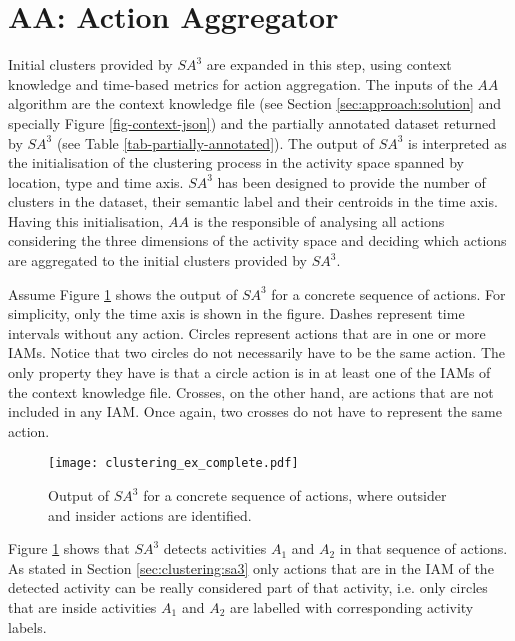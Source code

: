 \section{AA: Action Aggregator}
\label{sec:clustering:ac}

Initial clusters provided by $SA^3$ are expanded in this step, using context knowledge and time-based metrics for action aggregation. The inputs of the $AA$ algorithm are the context knowledge file (see Section \ref{sec:approach:solution} and specially Figure \ref{fig-context-json}) and the partially annotated dataset returned by $SA^3$ (see Table \ref{tab-partially-annotated}). The output of $SA^3$ is interpreted as the initialisation of the clustering process in the activity space spanned by location, type and time axis. $SA^3$ has been designed to provide the number of clusters in the dataset, their semantic label and their centroids in the time axis. Having this initialisation, $AA$ is the responsible of analysing all actions considering the three dimensions of the activity space and deciding which actions are aggregated to the initial clusters provided by $SA^3$.

Assume Figure \ref{fig-initial-clusters} shows the output of $SA^3$ for a concrete sequence of actions. For simplicity, only the time axis is shown in the figure. Dashes represent time intervals without any action. Circles represent actions that are in one or more IAMs. Notice that two circles do not necessarily have to be the same action. The only property they have is that a circle action is in at least one of the IAMs of the context knowledge file. Crosses, on the other hand, are actions that are not included in any IAM. Once again, two crosses do not have to represent the same action. 

\begin{figure}[htbp]%
\centering
\texttt{[image: clustering\_ex\_complete.pdf]}
    \caption{Output of $SA^3$ for a concrete sequence of actions, where outsider and insider actions are identified.}
    \label{fig-initial-clusters}
\end{figure}

Figure \ref{fig-initial-clusters} shows that $SA^3$ detects activities $A_1$ and $A_2$ in that sequence of actions. As stated in Section \ref{sec:clustering:sa3} only actions that are in the IAM of the detected activity can be really considered part of that activity, i.e. only circles that are inside activities $A_1$ and $A_2$ are labelled with corresponding activity labels. 

